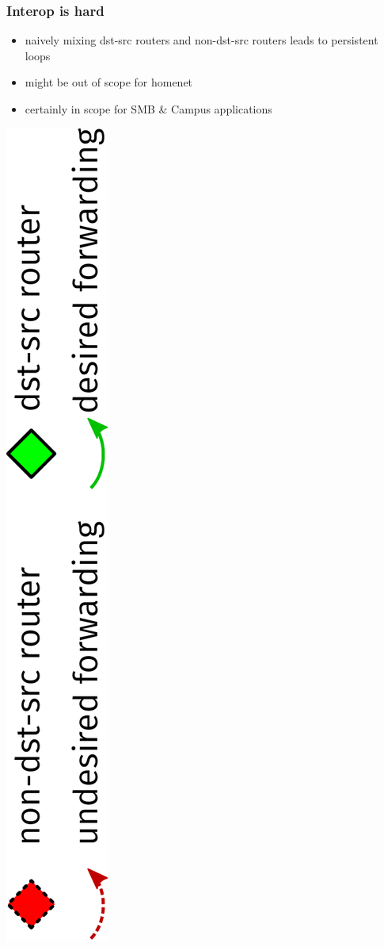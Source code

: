 \documentclass[12pt]{beamer}
\begin{document}
\begin{frame}
  \frametitle{Interop is hard}
  \begin{itemize}
    \item naively mixing dst-src routers and non-dst-src routers leads to persistent loops
    \item might be out of scope for homenet
    \item certainly in scope for SMB \& Campus applications
  \end{itemize}
  \vspace{10mm}
  \includegraphics[scale=0.45,angle=-90]{isis_loop_legend.pdf}%
\end{frame}
\end{document}
